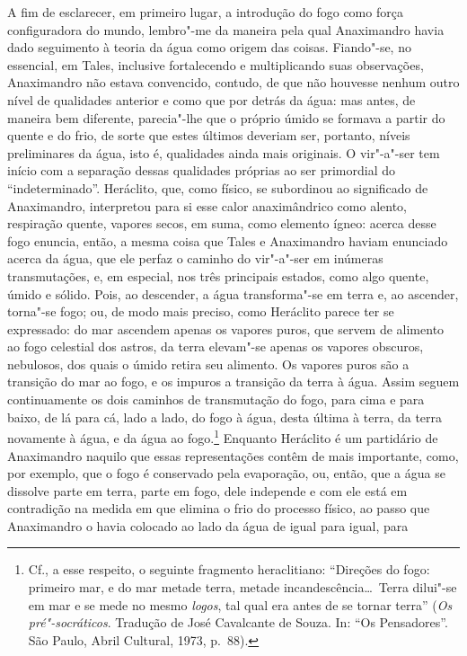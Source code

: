 A fim de esclarecer, em primeiro lugar, a introdução do fogo como força
configuradora do mundo, lembro"-me da maneira pela qual Anaximandro
havia dado seguimento à teoria da água como origem das coisas.
Fiando"-se, no essencial, em Tales, inclusive fortalecendo e
multiplicando suas observações, Anaximandro não estava convencido,
contudo, de que não houvesse nenhum outro nível de qualidades anterior
e como que por detrás da água: mas antes, de maneira bem diferente,
parecia"-lhe que o próprio úmido se formava a partir do quente e do
frio, de sorte que estes últimos deveriam ser, portanto, níveis
preliminares da água, isto é, qualidades ainda mais originais. O
vir"-a"-ser tem início com a separação dessas qualidades próprias ao ser
primordial do ``indeterminado''. Heráclito,
que, como físico, se subordinou ao significado de Anaximandro, interpretou
para si esse calor anaximândrico como alento, respiração quente, vapores
secos, em suma, como elemento ígneo: acerca desse fogo enuncia, então,
a mesma coisa que Tales e Anaximandro haviam enunciado acerca da água,
que ele perfaz o caminho do vir"-a"-ser em inúmeras transmutações, e, em
especial, nos três principais estados, como algo quente, úmido e
sólido. Pois, ao descender, a água transforma"-se em terra e, ao
ascender, torna"-se fogo; ou, de modo mais preciso, como Heráclito
parece ter se expressado: do mar ascendem apenas os vapores puros, que
servem de alimento ao fogo celestial dos astros, da terra elevam"-se
apenas os vapores obscuros, nebulosos, dos quais o úmido retira seu
alimento. Os vapores puros são a transição do mar ao fogo, 
e os impuros a transição da terra à água. Assim seguem continuamente
os dois caminhos de transmutação do fogo, para cima e para baixo, de lá
para cá, lado a lado, do fogo à água, desta última à terra, da terra
novamente à água, e da água ao fogo.\footnote{ Cf., a esse respeito, o
seguinte fragmento heraclitiano: ``Direções do fogo: primeiro mar, e do
mar metade terra, metade incandescência\ldots\ Terra dilui"-se em mar e se
mede no mesmo \textit{logos}, tal qual era antes de se tornar terra'' (\textit{Os
pré"-socráticos}. Tradução de José Cavalcante de Souza. In: ``Os
Pensadores''. São Paulo, Abril Cultural, 1973, p.~88).}
Enquanto Heráclito é um partidário de Anaximandro naquilo que essas
representações contêm de mais importante, como, por exemplo, que o fogo
é conservado pela evaporação, ou, então, que a água se dissolve parte
em terra, parte em fogo, dele independe e com ele está em contradição
na medida em que elimina o frio do processo físico, ao passo que
Anaximandro o havia colocado ao lado da água de igual para igual, para
